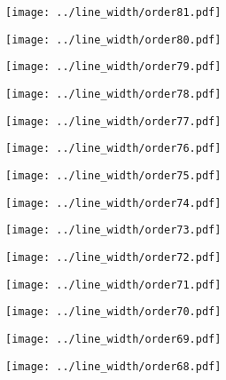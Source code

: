 \documentclass{article}
\begin{document}
\begin{figure}[H]
    \centering
    \texttt{[image: ../line\_width/order81.pdf]}
\end{figure}
\begin{figure}[H]
    \centering
    \texttt{[image: ../line\_width/order80.pdf]}
\end{figure}
\begin{figure}[H]
    \centering
    \texttt{[image: ../line\_width/order79.pdf]}
\end{figure}
\begin{figure}[H]
    \centering
    \texttt{[image: ../line\_width/order78.pdf]}
\end{figure}
\begin{figure}[H]
    \centering
    \texttt{[image: ../line\_width/order77.pdf]}
\end{figure}
\begin{figure}[H]
    \centering
    \texttt{[image: ../line\_width/order76.pdf]}
\end{figure}
\begin{figure}[H]
    \centering
    \texttt{[image: ../line\_width/order75.pdf]}
\end{figure}
\begin{figure}[H]
    \centering
    \texttt{[image: ../line\_width/order74.pdf]}
\end{figure}
\begin{figure}[H]
    \centering
    \texttt{[image: ../line\_width/order73.pdf]}
\end{figure}
\begin{figure}[H]
    \centering
    \texttt{[image: ../line\_width/order72.pdf]}
\end{figure}
\begin{figure}[H]
    \centering
    \texttt{[image: ../line\_width/order71.pdf]}
\end{figure}
\begin{figure}[H]
    \centering
    \texttt{[image: ../line\_width/order70.pdf]}
\end{figure}
\begin{figure}[H]
    \centering
    \texttt{[image: ../line\_width/order69.pdf]}
\end{figure}
\begin{figure}[H]
    \centering
    \texttt{[image: ../line\_width/order68.pdf]}
\end{figure}
\end{document}
